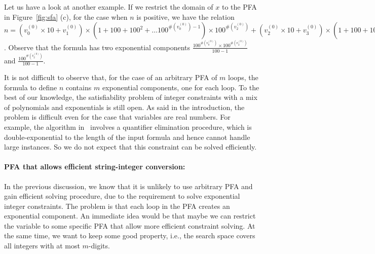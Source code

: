 \documentclass[sigplan,review,anonymous]{acmart}\settopmatter{printfolios=true,printccs=false,printacmref=false}
\begin{document}
Let us have a look at another example. If we restrict the domain of $x$ to the PFA in Figure~\ref{fig:sfa} (c), for the case when $n$ is positive, we have the relation $n= (v_0^{(0)}\times 10+ v_1^{(0)}) \times (1+100 +100^2 + \ldots 100 ^{\#(v_0^{(0)})-1})\times 100^{\#(v_2^{(0)})}+(v_2^{(0)}\times 10+ v_3^{(0)}) \times (1+100 +100^2 + \ldots 100 ^{\#(v_2^{(0)})-1}) =  (v_0^{(0)}\times 10+ v_1^{(0)}) \times \frac{100^{\#(v_0^{(0)})}-1}{100-1}\times 100^{\#(v_2^{(0)})} + (v_2^{(0)}\times 10+ v_3^{(0)}) \times \frac{100^{\#(v_2^{(0)})}-1}{100-1}$. Observe that the formula has two exponential components $\frac{100^{\#(v_0^{(0)})}\times 100^{\#(v_2^{(0)})} }{100-1}$ and $\frac{100^{\#(v_2^{(0)})} }{100-1}$.

It is not difficult to observe that, for the case of an arbitrary PFA of $m$ loops, the formula to define $n$ contains $m$ exponential components, one for each loop.
To the best of our knowledge, the satisfiability problem of integer constraints with a mix of polynomials and exponentials is still open. As said in the introduction, the problem is difficult even for the case that variables are real numbers. For example, the algorithm in~\cite{kincaid2019closed} involves a quantifier elimination procedure, which is double-exponential to the length of the input formula and hence cannot handle large instances. So we do not expect that this constraint can be solved efficiently.

\paragraph{PFA that allows efficient string-integer conversion: } In the previous discussion, we know that it is unlikely to use arbitrary PFA and gain efficient solving procedure, due to the requirement to solve exponential integer constraints. The problem is that each loop in the PFA creates an exponential component. An immediate idea would be that maybe we can restrict the variable to some specific PFA that allow more efficient constraint solving. At the same time, we want to keep some good property, i.e., the search space covers all integers with at most $m$-digits.
\end{document}
